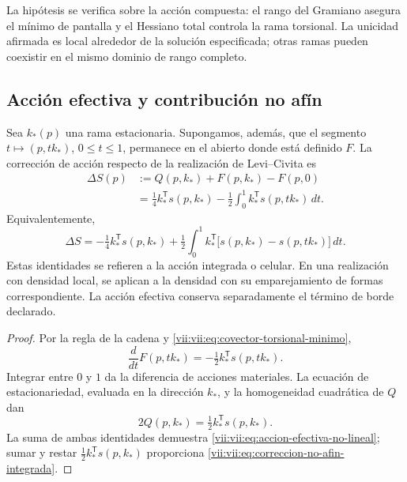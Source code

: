 La hipótesis se verifica sobre la acción compuesta: el rango del
Gramiano asegura el mínimo de pantalla y el Hessiano total controla
la rama torsional. La unicidad afirmada es local alrededor de la
solución especificada; otras ramas pueden coexistir en el mismo
dominio de rango completo.

\subsection{Acción efectiva y contribución no afín}
\label{vii:vii:subsec:accion-efectiva-no-afin}

\begin{theorem}
\label{vii:vii:thm:eliminacion-torsional-no-lineal}
Sea \(k_*(p)\) una rama estacionaria. Supongamos, además, que el
segmento \(t\mapsto (p,tk_*)\), \(0\leq t\leq1\), permanece
en el abierto donde está definido \(F\). La corrección de acción
respecto de la realización de Levi--Civita es
\begin{equation}
 \begin{split}
 \Delta S(p)
  &:=Q(p,k_*)+F(p,k_*)-F(p,0)\\
  &=\tfrac14 k_*^{\mathsf T}s(p,k_*)
     -\tfrac12\int_0^1
           k_*^{\mathsf T}s(p,tk_*)\,dt.
 \end{split}
 \label{vii:vii:eq:accion-efectiva-no-lineal}
\end{equation}
Equivalentemente,
\begin{equation}
 \Delta S=-\tfrac14 k_*^{\mathsf T}s(p,k_*)
  +\tfrac12\int_0^1 k_*^{\mathsf T}
       \bigl[s(p,k_*)-s(p,tk_*)\bigr]\,dt.
 \label{vii:vii:eq:correccion-no-afin-integrada}
\end{equation}
Estas identidades se refieren a la acción integrada o celular.
En una realización con densidad local, se aplican a la densidad
con su emparejamiento de formas correspondiente. La acción efectiva
conserva separadamente el término de borde declarado.
\end{theorem}

\begin{proof}
Por la regla de la cadena y
\eqref{vii:vii:eq:covector-torsional-minimo},
\[
 \frac{d}{dt}F(p,tk_*)
      =-\tfrac12 k_*^{\mathsf T}s(p,tk_*).
\]
Integrar entre \(0\) y \(1\) da la diferencia de acciones
materiales. La ecuación de estacionariedad, evaluada en la
dirección \(k_*\), y la homogeneidad cuadrática de \(Q\) dan
\[
 2Q(p,k_*)=\tfrac12 k_*^{\mathsf T}s(p,k_*).
\]
La suma de ambas identidades demuestra
\eqref{vii:vii:eq:accion-efectiva-no-lineal}; sumar y restar
\(\tfrac12k_*^{\mathsf T}s(p,k_*)\) proporciona
\eqref{vii:vii:eq:correccion-no-afin-integrada}.
\end{proof}

